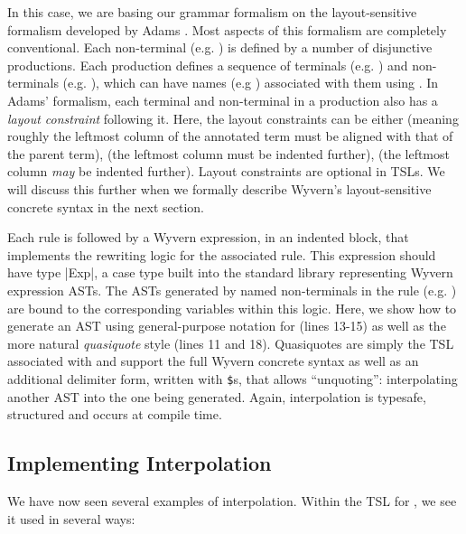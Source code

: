 In this case, we are basing our grammar formalism on the layout-sensitive formalism developed by Adams \cite{Adams:2013:PPI:2429069.2429129}. Most aspects of this formalism are completely conventional. 
Each non-terminal (e.g. ) is defined by a number of disjunctive productions. Each production defines a sequence of terminals (e.g. ) and non-terminals (e.g. ), which can have names (e.g ) associated with them using \li{::}. In Adams' formalism, each terminal and non-terminal in a production also has a \emph{layout constraint} following it. Here, the layout constraints can be either \li{=} (meaning roughly the leftmost column of the annotated term must be aligned with that of the parent term), \li{>} (the leftmost column must be indented further), \li{>=} (the leftmost column \emph{may} be indented further). Layout constraints are optional in TSLs. We will discuss this further when we formally describe Wyvern's layout-sensitive concrete syntax in the next section.

Each rule is followed by a Wyvern expression, in an indented block, that implements the rewriting logic for the associated rule. This expression should have type \li|Exp|, a case type built into the standard library representing Wyvern expression ASTs. The ASTs generated by named non-terminals in the rule (e.g. ) are bound to the corresponding variables within this logic. Here, we show how to generate an AST using general-purpose notation for  (lines 13-15) as well as the more natural \emph{quasiquote} style (lines 11 and 18). Quasiquotes are simply the TSL associated with  and support the full Wyvern concrete syntax as well as an additional delimiter form, written with \verb|$|s, that allows ``unquoting'': interpolating another AST into the one being generated. Again, interpolation is typesafe, structured and occurs at compile time.

\subsection{Implementing Interpolation}\label{ss:implementing-interpolation}
We have now seen several examples of interpolation. Within the TSL for , we see it used in several ways:

